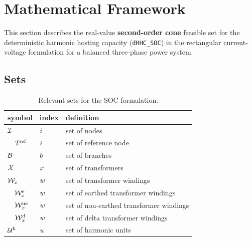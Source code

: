 \documentclass[journal]{IEEEtran}
\begin{document}
\section{Mathematical Framework}
\label{sec:mathematical_framework}

This section describes the real-value \textbf{second-order cone} feasible set for the deterministic harmonic hosting capacity (\texttt{dHHC\_SOC}) in the rectangular current-voltage formulation for a balanced three-phase power system. 

\subsection{Sets}

\begin{table}[H]
    \centering
    \caption{Relevant sets for the SOC formulation.}
    \label{tab:sets_soc}
    \begin{tabular}{l l l }
        symbol                                  & index         & definition                                                \\ \hline
        $\mathcal{I}$                              & $i$       & set of nodes                                              \\
        $\quad \mathcal{I}^{\text{ref}}$                     & $i$       & set of reference node                                     \\ 
        $\mathcal{B}$                              & $b$       & set of branches                                           \\ 
        $\mathcal{X}$                              & $x$       & set of transformers                                       \\ 
        $\mathcal{W}_{x}$                   & $w$    & set of transformer windings                               \\
        $\quad \mathcal{W}^{\text{e}}_{x}$  & $w$    & set of earthed transformer windings                       \\
        $\quad \mathcal{W}^{\text{ne}}_{x}$ & $w$    & set of non-earthed transformer windings                   \\
        $\quad \mathcal{W}^{\text{d}}_{x}$  & $w$    & set of delta transformer windings                         \\
        $\mathcal{U}^{\text{h}}$                      & $u$       & set of harmonic units                                     \\   

\end{tabular}
\end{table}
\end{document}
